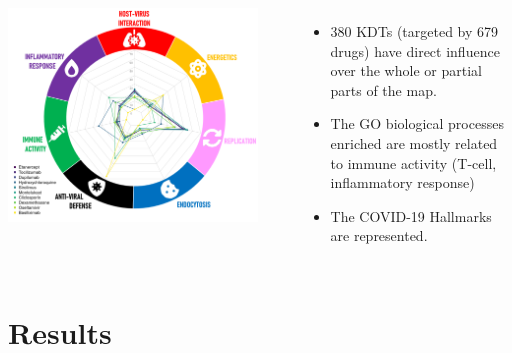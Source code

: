 \documentclass[compress,ignorenonframetext,aspectratio=1610,handout]{beamer}
\begin{document}
\begin{frame}
	\begin{columns}
		\centering
		\includegraphics[width=0.9\textwidth]{figs/methods/radar.png}
		
		\begin{itemize}
		\item 380 KDTs (targeted by 679 drugs) have direct influence over the whole or partial parts of the map.
		\item The GO biological processes enriched are mostly related to immune activity (T-cell, inflammatory response)
		\item The COVID-19 Hallmarks are represented.
	\end{itemize}
	\end{columns}
\end{frame}



\section{Results}
\end{document}

